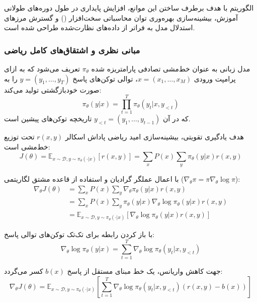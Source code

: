 الگوریتم  با هدف برطرف ساختن این موانع، افزایش پایداری در طول دوره‌های طولانی آموزش، بیشینه‌سازی بهره‌وری توان محاسباتی سخت‌افزار () و گسترش مرزهای استدلال مدل به فراتر از داده‌های نظارت‌شده طراحی شده است.

\subsubsection*{مبانی نظری و اشتقاق‌های کامل ریاضی}

مدل زبانی به عنوان خط‌مشی تصادفی پارامتریزه شده $\pi_\theta$ تعریف می‌شود که به ازای پرامپت ورودی $x = (x_1, \dots, x_M)$، توالی توکن‌های پاسخ $y = (y_1, \dots, y_T)$ را به صورت خودبازگشتی تولید می‌کند:
\begin{equation}
	\pi_\theta(y | x) = \prod_{t=1}^T \pi_\theta(y_t | x, y_{<t})
\end{equation}
که در آن $y_{<t} = (y_1, \dots, y_{t-1})$ تاریخچه توکن‌های پیشین است.

هدف یادگیری تقویتی، بیشینه‌سازی امید ریاضی پاداش اسکالر $r(x, y)$ تحت توزیع خط‌مشی است:
\begin{equation}
	J(\theta) = \mathbb{E}_{x \sim \mathcal{D}, y \sim \pi_\theta(\cdot | x)} [r(x, y)] = \sum_{x} P(x) \sum_{y} \pi_\theta(y | x) r(x, y)
\end{equation}

با اعمال عملگر گرادیان و استفاده از قاعده مشتق لگاریتمی ($\nabla_\theta \pi = \pi \nabla_\theta \log \pi$):
\begin{align}
	\nabla_\theta J(\theta) &= \sum_{x} P(x) \sum_{y} \nabla_\theta \pi_\theta(y | x) r(x, y) \nonumber \\
	&= \sum_{x} P(x) \sum_{y} \pi_\theta(y | x) \nabla_\theta \log \pi_\theta(y | x) r(x, y) \nonumber \\
	&= \mathbb{E}_{x \sim \mathcal{D}, y \sim \pi_\theta(\cdot | x)} \left[ \nabla_\theta \log \pi_\theta(y | x) r(x, y) \right]
\end{align}

با باز کردن رابطه برای تک‌تک توکن‌های توالی پاسخ:
\begin{equation}
	\nabla_\theta \log \pi_\theta(y | x) = \sum_{t=1}^T \nabla_\theta \log \pi_\theta(y_t | x, y_{<t})
\end{equation}

جهت کاهش واریانس، یک خط مبنای مستقل از پاسخ $b(x)$ کسر می‌گردد:
\begin{equation}
	\nabla_\theta J(\theta) = \mathbb{E}_{x \sim \mathcal{D}, y \sim \pi_\theta(\cdot | x)} \left[ \sum_{t=1}^T \nabla_\theta \log \pi_\theta(y_t | x, y_{<t}) \left( r(x, y) - b(x) \right) \right]
\end{equation}

